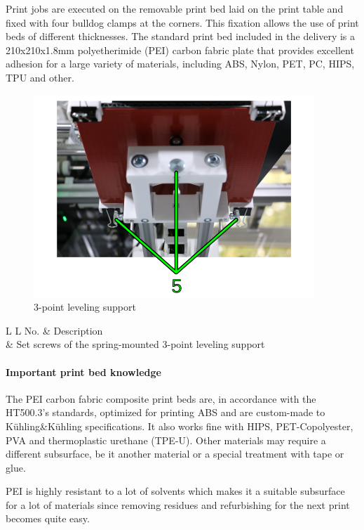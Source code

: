 Print jobs are executed on the removable print bed laid on the print table and fixed with four bulldog clamps at the corners. This fixation allows the use of print beds of different thicknesses.
The standard print bed included in the delivery is a 210x210x1.8mm polyetherimide (PEI) carbon fabric plate that provides excellent adhesion for a large variety of materials, including ABS, Nylon, PET, PC, HIPS, TPU and other. 

\begin{figure}[H]
  \centering
  \includegraphics[width=.7\linewidth]{./img/print_table_overview_2.png}
  \caption{3-point leveling support}
\end{figure}

\begin{table}[H]
  \centering
  \begin{tabulary}{\textwidth}{ L L }
    \toprule
    No.  &  Description \\
      &  Set screws of the spring-mounted 3-point leveling support \\
    \bottomrule
  \end{tabulary}
\end{table}

\paragraph{Important print bed knowledge}

The PEI carbon fabric composite print beds are, in accordance with the HT500.3's standards, optimized for printing ABS and are custom-made to Kühling\&Kühling specifications. It also works fine with HIPS, PET-Copolyester, PVA and thermoplastic urethane (TPE-U). Other materials may require a different subsurface, be it another material or a special treatment with tape or glue.

PEI is highly resistant to a lot of solvents which makes it a suitable subsurface for a lot of materials since removing residues and refurbishing for the next print becomes quite easy.

